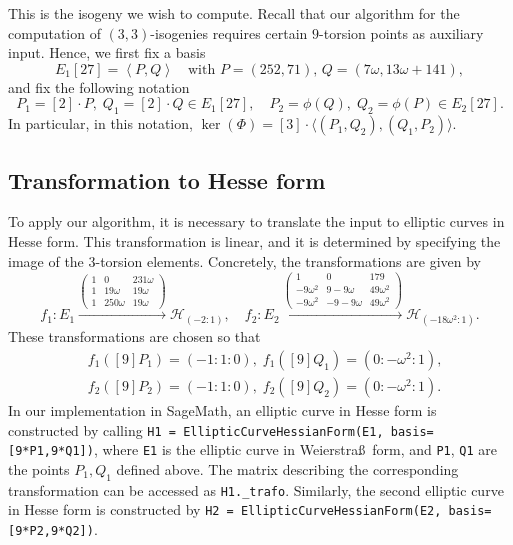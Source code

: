 \documentclass[11pt]{amsart}
\theoremstyle{definition}
\renewcommand{\H}{\mathcal{H}}
\newcommand{\HH}{\mathcal{H}}
\let \H\HH
\begin{document}
This is the isogeny we wish to compute. Recall that our algorithm for the computation of $(3,3)$-isogenies requires certain $9$-torsion points as auxiliary input. Hence, we first fix a basis 
\[
E_1[27] = \left\langle P,Q \right\rangle \quad \text{with } P = (252,71),\, Q = (7\omega,13\omega+141),
\]
and fix the following notation
\[
P_1 = [2] \cdot P, \; Q_1 = [2] \cdot Q \in  E_1[27], \quad P_2 = \phi(Q), \; Q_2 = \phi(P) \in E_2[27].
\]
In particular, in this notation, $\ker(\Phi) = [3] \cdot \langle (P_1,Q_2), (Q_1,P_2) \rangle$.

\subsection{Transformation to Hesse form}
To apply our algorithm, it is necessary to translate the input to elliptic curves in Hesse form. This transformation is linear, and it is determined by specifying the image of the $3$-torsion elements. Concretely, %
the transformations are given by
\[
f_1: E_1 \xrightarrow{\begin{pmatrix} 1 & 0 & 231 \omega \\
1 & 19 \omega & 19 \omega \\
1 & 250 \omega & 19 \omega
 \end{pmatrix}} \H_{(-2:1)},
 \quad 
f_2:  E_2 \xrightarrow{\begin{pmatrix} 1 & 0 & 179 \\
-9\omega^2 & 9-9\omega & 49 \omega^2 \\
-9\omega^2 & -9-9\omega& 49 \omega^2
 \end{pmatrix}} \H_{(-18\omega^2:1)}.
\]
These transformations are chosen so that
\begin{align*}
&f_1([9]P_1) = (-1:1:0), \; f_1([9]Q_1) = (0:-\omega^2:1),\\
&f_2([9]P_2) = (-1:1:0), \; f_2([9]Q_2) = (0:-\omega^2:1).
\end{align*}
In our implementation in SageMath, an elliptic curve in Hesse form is constructed by calling
\texttt{H1 = EllipticCurveHessianForm(E1, basis=[9*P1,9*Q1])}, 
where \texttt{E1} is the elliptic curve in Weierstra\ss\ form, and \texttt{P1}, \texttt{Q1} are the points $P_1,Q_1$ defined above. The matrix describing the corresponding transformation can be accessed as \texttt{H1.\_trafo}. Similarly, the second elliptic curve in Hesse form is constructed by \texttt{H2 = EllipticCurveHessianForm(E2, basis=[9*P2,9*Q2])}. 
\end{document}
